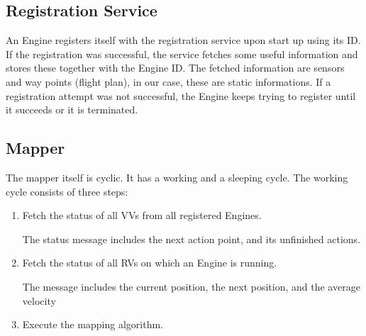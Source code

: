 \subsection{Registration Service}
An Engine registers itself with the registration service upon start up using its ID. If the registration was successful, the service
fetches some useful information and stores these together with the Engine ID. The fetched information are sensors and 
way points (flight plan), in our case, these are static informations. If a registration attempt was not successful, the Engine 
keeps trying to register until it succeeds or it is terminated.

\subsection{Mapper}
The mapper itself is cyclic. It has a working and a sleeping cycle.
The working cycle consists of three steps:


\begin{enumerate}
  \item Fetch the status of all \acp{VV} from all registered Engines.
  
  The status message includes the next action point, and its unfinished actions.
  
  \item Fetch the status of all \acp{RV} on which an Engine is running.
  
  The message includes the current position, the next position, and the average velocity
  
  \item Execute the mapping algorithm.
\end{enumerate}

